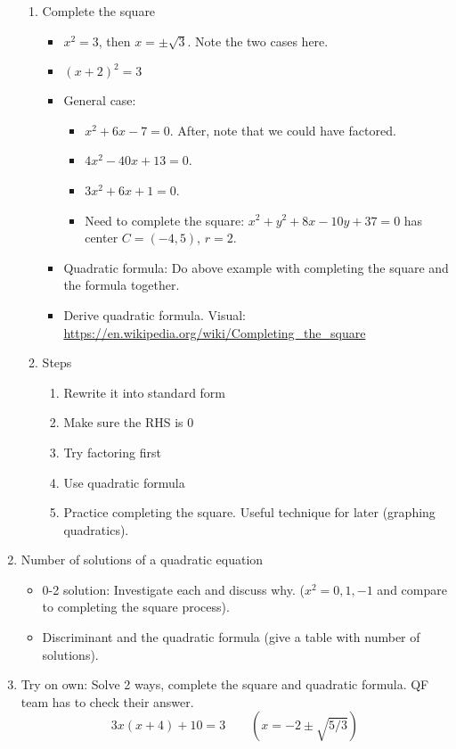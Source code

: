 \documentclass{article}
\begin{document}
\begin{enumerate}
\begin{enumerate}
\item Complete the square
\begin{itemize}
\item $x^2 = 3$, then $x=\pm \sqrt{3}$. Note the two cases here. 
\item $(x+2)^2 = 3$
\item General case: 
\begin{itemize}
\item $x^2+6x-7=0$. After, note that we could have factored. 
\item $4x^2-40x+13=0$. 
\item $3x^2+6x+1=0$.
\item Need to complete the square: $x^2+y^2+8x-10y+37=0$ has center $C=(-4,5)$, $r=2$.
\end{itemize}
\item Quadratic formula: Do above example with completing the square and the formula together. 
\item Derive quadratic formula. Visual: \url{https://en.wikipedia.org/wiki/Completing_the_square}
\end{itemize}
\item Steps
\begin{enumerate}
\item Rewrite it into standard form
\item Make sure the RHS is 0
\item Try factoring first
\item Use quadratic formula
\item Practice completing the square. Useful technique for later (graphing quadratics).
\end{enumerate}
\end{enumerate}

\item Number of solutions of a quadratic equation
\begin{itemize}
\item 0-2 solution: Investigate each and discuss why. ($x^2=0,1,-1$ and compare to completing the square process). 
\item Discriminant and the quadratic formula (give a table with number of solutions).
\end{itemize}

\item Try on own: Solve 2 ways, complete the square and quadratic formula. QF team has to check their answer.
$$
3x(x+4)+10=3 \quad \quad (x=-2\pm\sqrt{5/3})
$$


\end{enumerate}
\end{document}
